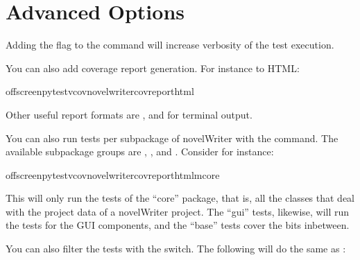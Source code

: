 \documentclass[a4paper,11pt,english]{sphinxmanual}
\begin{document}
\section{Advanced Options}
\label{\detokenize{tech_tests:advanced-options}}
\sphinxAtStartPar
Adding the flag  to the  command will increase verbosity of the test execution.

\sphinxAtStartPar
You can also add coverage report generation. For instance to HTML:

\begin{sphinxVerbatim}[commandchars=\\\{\}]
offscreenpytest\PYGZhy{}v\PYGZhy{}\PYGZhy{}covnovelwriter\PYGZhy{}\PYGZhy{}cov\PYGZhy{}reporthtml
\end{sphinxVerbatim}

\sphinxAtStartPar
Other useful report formats are , and  for terminal output.

\sphinxAtStartPar
You can also run tests per subpackage of novelWriter with the  command. The available
subpackage groups are , , and . Consider for instance:

\begin{sphinxVerbatim}[commandchars=\\\{\}]
offscreenpytest\PYGZhy{}v\PYGZhy{}\PYGZhy{}covnovelwriter\PYGZhy{}\PYGZhy{}cov\PYGZhy{}reporthtml\PYGZhy{}mcore
\end{sphinxVerbatim}

\sphinxAtStartPar
This will only run the tests of the “core” package, that is, all the classes that deal with the
project data of a novelWriter project. The “gui” tests, likewise, will run the tests for the GUI
components, and the “base” tests cover the bits in\sphinxhyphen{}between.

\sphinxAtStartPar
You can also filter the tests with the  switch. The following will do the same as
:
\end{document}
